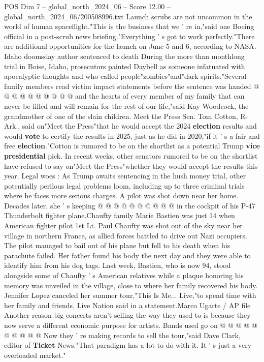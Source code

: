 \begin{textsample}{POS Dim 7 – global\_north\_2024\_06 – Score 12.00 – global\_north\_2024\_06/200508996.txt}
Launch scrubs are not uncommon in the world of human spaceflight."This is the business that we ' re in,"said one Boeing official in a post-scrub news briefing."Everything ' s got to work perfectly."There are additional opportunities for the launch on June 5 and 6, according to NASA.
Idaho doomsday author sentenced to death During the more than monthlong trial in Boise, Idaho, prosecutors painted Daybell as someone infatuated with apocalyptic thoughts and who called people"zombies"and"dark spirits."Several family members read victim impact statements before the sentence was handed @ @ @ @ @ @ @ @ @ @ and the hearts of every member of my family that can never be filled and will remain for the rest of our life,"said Kay Woodcock, the grandmother of one of the slain children.
Meet the Press Sen.
Tom Cotton, R-Ark., said on"Meet the Press"that he would accept the 2024 \textbf{election} results and would \textbf{vote} to certify the results in 2025, just as he did in 2020,"if it ' s a fair and free \textbf{election}."Cotton is rumored to be on the shortlist as a potential Trump \textbf{vice} \textbf{presidential} pick.
In recent weeks, other senators rumored to be on the shortlist have refused to say on"Meet the Press"whether they would accept the results this year.
Legal woes : As Trump awaits sentencing in the hush money trial, other potentially perilous legal problems loom, including up to three criminal trials where he faces more serious charges.
A pilot was shot down near her home.
Decades later, she ' s keeping @ @ @ @ @ @ @ @ @ @ in the cockpit of his P-47 Thunderbolt fighter plane.Chaufty family Marie Bastien was just 14 when American fighter pilot 1st Lt.
Paul Chaufty was shot out of the sky near her village in northern France, as allied forces battled to drive out Nazi occupiers.
The pilot managed to bail out of his plane but fell to his death when his parachute failed.
Her father found his body the next day and they were able to identify him from his dog tags.
Last week, Bastien, who is now 94, stood alongside some of Chaufty ' s American relatives while a plaque honoring his memory was unveiled in the village, close to where her family recovered his body.
Jennifer Lopez canceled her summer tour,"This Is Me...
Live,"to spend time with her family and friends, Live Nation said in a statement.Marco Ugarte / AP file Another reason big concerts aren't selling the way they used to is because they now serve a different economic purpose for artists.
Bands used go on @ @ @ @ @ @ @ @ @ @ Now they ' re making records to sell the tour,"said Dave Clark, editor of \textbf{Ticket} News."That paradigm has a lot to do with it.
It ' s just a very overloaded market."

\end{textsample}
